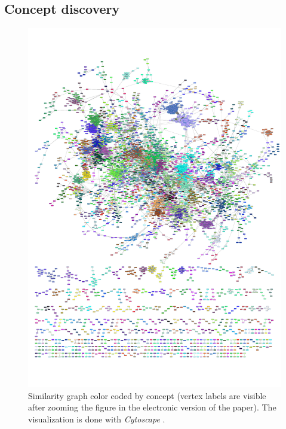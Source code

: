 \documentclass{kais}
\begin{document}
\subsection{Concept discovery}
\begin{figure}
\centerline{\includegraphics[width=1.0\columnwidth]{figures/slpa-complete-adjusted_cropped.pdf}}
\caption{Similarity graph color coded by concept (vertex labels are visible after zooming the figure in the electronic 
version of the paper). The visualization is done with \emph{Cytoscape} \protect\cite{Shannon2003}.}
\label{fig:graph-overview}
\end{figure}
\end{document}
